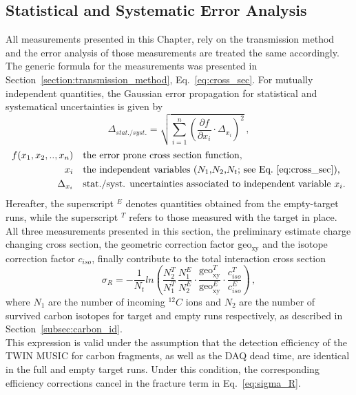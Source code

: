 \newpage



\subsection{Statistical and Systematic Error Analysis}\label{sec:err_analysis}
All measurements presented in this Chapter, rely on the transmission method and the error analysis of those measurements are treated the same accordingly. The generic formula for the measurements was presented in Section~\ref{section:transmission_method}, Eq.~\ref{eq:cross_sec}.\newline
For mutually independent quantities, the Gaussian error propagation for statistical and systematical uncertainties is given by
\begin{equation}
\Delta_{stat./syst.}  = \sqrt{\sum_{i=1}^n \left( \frac{\partial f}{\partial x_i} \cdot \Delta_{x_i} \right)^2 } \, ,
\end{equation}
\begin{align*}
	f(x_1,x_2,..,x_n) &\quad \text{the error prone cross section function,} \\
	x_i  &\quad \text{the independent variables ($N_1$,$N_2$,$N_t$; see Eq.~\ref{eq:cross_sec}),} \\
	\Delta_{x_i} &\quad \text{stat./syst. uncertainties associated to independent variable $x_i$.}
\end{align*}
Hereafter, the superscript $^E$ denotes quantities obtained from the empty-target runs, while the superscript $^T$ refers to those measured with the target in place.
All three measurements presented in this section, the preliminary estimate charge changing cross section, the geometric correction factor geo$_{\text{xy}}$ and the isotope correction factor $c_{iso}$, finally contribute to the total interaction cross section
\begin{equation}\label{eq:sigma_R}
\sigma_R = -\frac{1}{N_t}ln\left(\frac{N^T_2}{N^T_1} \, \frac{N^E_1}{N^E_2} \cdot \frac{\text{geo}^T_{\text{xy}}}{\text{geo}^E_{\text{xy}}} \cdot \frac{c^T_{iso}}{c^E_{iso}}\right) \, ,
\end{equation}
where $N_1$ are the number of incoming $^{12}C$ ions and $N_2$ are the number of survived carbon isotopes for target and empty runs respectively, as described in Section~\ref{subsec:carbon_id}.\\
This expression is valid under the assumption that the detection efficiency of the TWIN MUSIC for carbon fragments, as well as the DAQ dead time, are identical in the full and empty target runs. Under this condition, the corresponding efficiency corrections cancel in the fracture term in Eq.~\ref{eq:sigma_R}.

